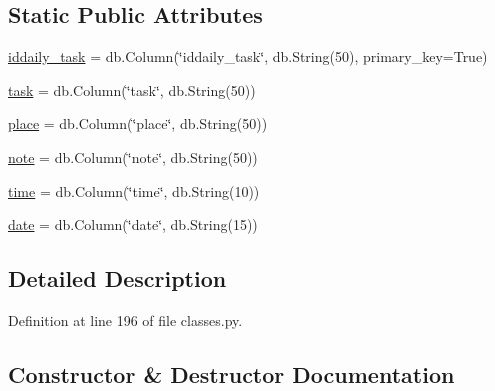 \subsection*{Static Public Attributes}
\begin{DoxyCompactItemize}
\item 
\hyperlink{class_web_content_1_1classes_1_1daily__task_a16bbcb32784e7dce04634c70d657d17d}{iddaily\+\_\+task} = db.\+Column(\char`\"{}iddaily\+\_\+task\char`\"{}, db.\+String(50), primary\+\_\+key=True)
\item 
\hyperlink{class_web_content_1_1classes_1_1daily__task_aafd4c49d7d757e26f13bf61a4e6aa875}{task} = db.\+Column(\char`\"{}task\char`\"{}, db.\+String(50))
\item 
\hyperlink{class_web_content_1_1classes_1_1daily__task_acd856b954382e792e6e5c28fd830121e}{place} = db.\+Column(\char`\"{}place\char`\"{}, db.\+String(50))
\item 
\hyperlink{class_web_content_1_1classes_1_1daily__task_a8adebd433b814a8e63ddff8c74dec3ae}{note} = db.\+Column(\char`\"{}note\char`\"{}, db.\+String(50))
\item 
\hyperlink{class_web_content_1_1classes_1_1daily__task_ad2c51b720cec786c89d5742e03b240ca}{time} = db.\+Column(\char`\"{}time\char`\"{}, db.\+String(10))
\item 
\hyperlink{class_web_content_1_1classes_1_1daily__task_a3d81a54b4ec50f7b09a5c9a7126e1b91}{date} = db.\+Column(\char`\"{}date\char`\"{}, db.\+String(15))
\end{DoxyCompactItemize}


\subsection{Detailed Description}


Definition at line 196 of file classes.\+py.



\subsection{Constructor \& Destructor Documentation}
\mbox{\label{class_web_content_1_1classes_1_1daily__task_ad42f8d2b69ae7b520baf2ff107d412dd}} 
